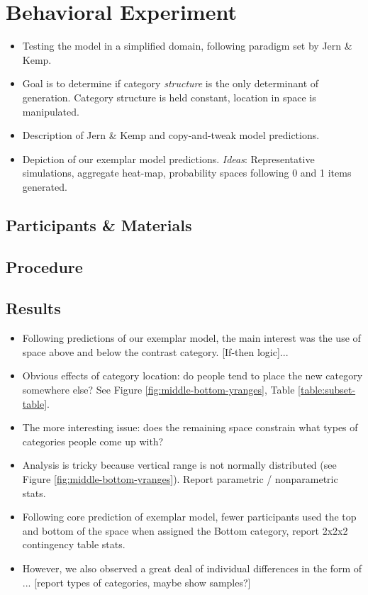 \documentclass[10pt,letterpaper]{article}
\begin{document}
\section{Behavioral Experiment}
\begin{itemize}
\item Testing the model in a simplified domain, following paradigm set by Jern \& Kemp.
\item Goal is to determine if category \textit{structure} is the only determinant of generation. Category structure is held constant, location in space is manipulated.
\item Description of Jern \& Kemp and copy-and-tweak model predictions.
\item Depiction of our exemplar model predictions. \textit{Ideas}: Representative simulations, aggregate heat-map, probability spaces following 0 and 1 items generated. %
\end{itemize}

\subsection{Participants \& Materials}
\subsection{Procedure}
\subsection{Results}

\begin{itemize}
\item Following predictions of our exemplar model, the main interest was the use of space above and below the contrast category. [If-then logic]...
\item Obvious effects of category location: do people tend to place the new category somewhere else? See Figure \ref{fig:middle-bottom-yranges}, Table \ref{table:subset-table}.
\item The more interesting issue: does the remaining space constrain what types of categories people come up with? 
\item Analysis is tricky because vertical range is not normally distributed (see Figure \ref{fig:middle-bottom-yranges}). Report parametric / nonparametric stats.
\item Following core prediction of exemplar model, fewer participants used the top and bottom of the space when assigned the Bottom category, report 2x2x2 contingency table stats.
\item However, we also observed a great deal of individual differences in the form of ... [report types of categories, maybe show samples?]
\end{itemize}
\end{document}

